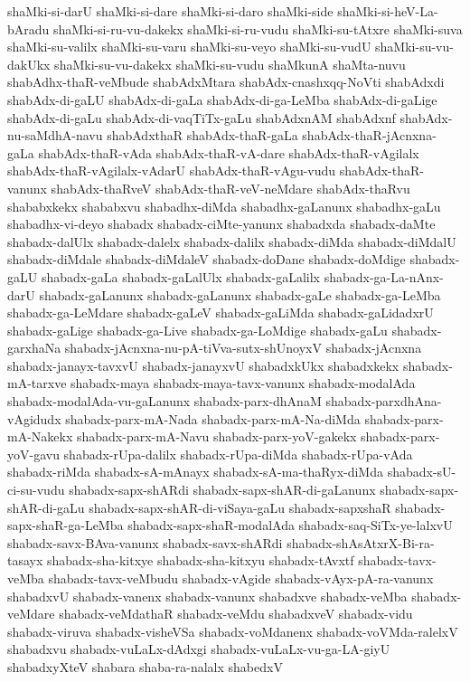 {shaMki-si-darU
shaMki-si-dare
shaMki-si-daro
shaMki-side
shaMki-si-heV-La-bAradu
shaMki-si-ru-vu-dakekx
shaMki-si-ru-vudu
shaMki-su-tAtxre
shaMki-suva
shaMki-su-valilx
shaMki-su-varu
shaMki-su-veyo
shaMki-su-vudU
shaMki-su-vu-dakUkx
shaMki-su-vu-dakekx
shaMki-su-vudu
shaMkunA
shaMta-nuvu
shabAdhx-thaR-veMbude
shabAdxMtara
shabAdx-cnashxqq-NoVti
shabAdxdi
shabAdx-di-gaLU
shabAdx-di-gaLa
shabAdx-di-ga-LeMba
shabAdx-di-gaLige
shabAdx-di-gaLu
shabAdx-di-vaqTiTx-gaLu
shabAdxnAM
shabAdxnf
shabAdx-nu-saMdhA-navu
shabAdxthaR
shabAdx-thaR-gaLa
shabAdx-thaR-jAcnxna-gaLa
shabAdx-thaR-vAda
shabAdx-thaR-vA-dare
shabAdx-thaR-vAgilalx
shabAdx-thaR-vAgilalx-vAdarU
shabAdx-thaR-vAgu-vudu
shabAdx-thaR-vanunx
shabAdx-thaRveV
shabAdx-thaR-veV-neMdare
shabAdx-thaRvu
shababxkekx
shababxvu
shabadhx-diMda
shabadhx-gaLanunx
shabadhx-gaLu
shabadhx-vi-deyo
shabadx
shabadx-ciMte-yanunx
shabadxda
shabadx-daMte
shabadx-dalUlx
shabadx-dalelx
shabadx-dalilx
shabadx-diMda
shabadx-diMdalU
shabadx-diMdale
shabadx-diMdaleV
shabadx-doDane
shabadx-doMdige
shabadx-gaLU
shabadx-gaLa
shabadx-gaLalUlx
shabadx-gaLalilx
shabadx-ga-La-nAnx-darU
shabadx-gaLanunx
shabadx-gaLanunx
shabadx-gaLe
shabadx-ga-LeMba
shabadx-ga-LeMdare
shabadx-gaLeV
shabadx-gaLiMda
shabadx-gaLidadxrU
shabadx-gaLige
shabadx-ga-Live
shabadx-ga-LoMdige
shabadx-gaLu
shabadx-garxhaNa
shabadx-jAcnxna-nu-pA-tiVva-sutx-shUnoyxV
shabadx-jAcnxna
shabadx-janayx-tavxvU
shabadx-janayxvU
shabadxkUkx
shabadxkekx
shabadx-mA-tarxve
shabadx-maya
shabadx-maya-tavx-vanunx
shabadx-modalAda
shabadx-modalAda-vu-gaLanunx
shabadx-parx-dhAnaM
shabadx-parxdhAna-vAgidudx
shabadx-parx-mA-Nada
shabadx-parx-mA-Na-diMda
shabadx-parx-mA-Nakekx
shabadx-parx-mA-Navu
shabadx-parx-yoV-gakekx
shabadx-parx-yoV-gavu
shabadx-rUpa-dalilx
shabadx-rUpa-diMda
shabadx-rUpa-vAda
shabadx-riMda
shabadx-sA-mAnayx
shabadx-sA-ma-thaRyx-diMda
shabadx-sU-ci-su-vudu
shabadx-sapx-shARdi
shabadx-sapx-shAR-di-gaLanunx
shabadx-sapx-shAR-di-gaLu
shabadx-sapx-shAR-di-viSaya-gaLu
shabadx-sapxshaR
shabadx-sapx-shaR-ga-LeMba
shabadx-sapx-shaR-modalAda
shabadx-saq-SiTx-ye-lalxvU
shabadx-savx-BAva-vanunx
shabadx-savx-shARdi
shabadx-shAsAtxrX-Bi-ra-tasayx
shabadx-sha-kitxye
shabadx-sha-kitxyu
shabadx-tAvxtf
shabadx-tavx-veMba
shabadx-tavx-veMbudu
shabadx-vAgide
shabadx-vAyx-pA-ra-vanunx
shabadxvU
shabadx-vanenx
shabadx-vanunx
shabadxve
shabadx-veMba
shabadx-veMdare
shabadx-veMdathaR
shabadx-veMdu
shabadxveV
shabadx-vidu
shabadx-viruva
shabadx-visheVSa
shabadx-voMdanenx
shabadx-voVMda-ralelxV
shabadxvu
shabadx-vuLaLx-dAdxgi
shabadx-vuLaLx-vu-ga-LA-giyU
shabadxyXteV
shabara
shaba-ra-nalalx
shabedxV
}

